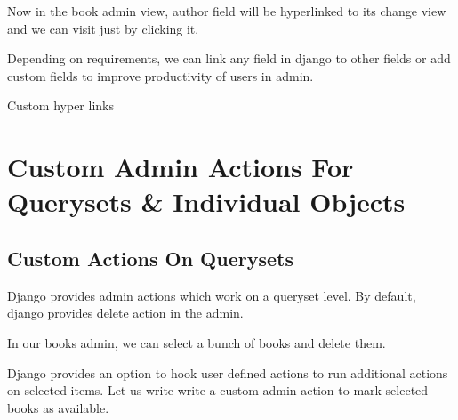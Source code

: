\documentclass[letterpaper,12pt,english]{sphinxmanual}
\begin{document}
Now in the book admin view, author field will be hyperlinked to its change view and we can visit just by clicking it.

Depending on requirements, we can link any field in django to other fields or add custom fields to improve productivity of users in admin.

Custom hyper links



\chapter{Custom Admin Actions For Querysets \& Individual Objects}
\label{\detokenize{admin_custom_admin_actions:custom-admin-actions-for-querysets-individual-objects}}\label{\detokenize{admin_custom_admin_actions::doc}}

\section{Custom Actions On Querysets}
\label{\detokenize{admin_custom_admin_actions:custom-actions-on-querysets}}
Django provides admin actions which work on a queryset level. By default, django provides delete action in the admin.

In our books admin, we can select a bunch of books and delete them.


Django provides an option to hook user defined actions to run additional actions on selected items. Let us write write a custom admin action to mark selected books as available.

\begin{sphinxVerbatim}[commandchars=\\\{\}]
 
      
        

        
      
\end{sphinxVerbatim}
\end{document}
